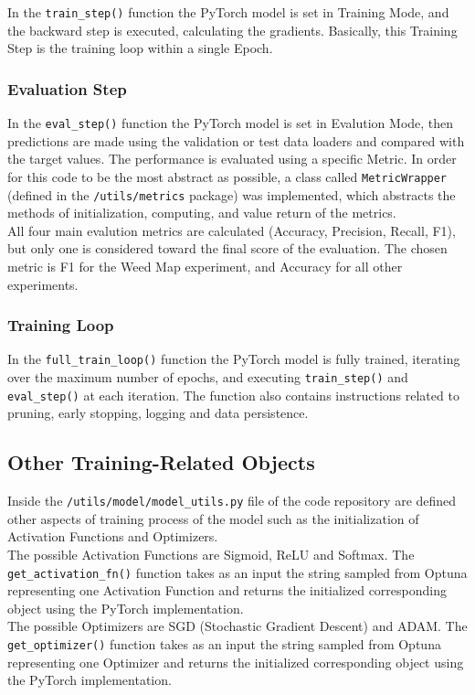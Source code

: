In the \texttt{train\_step()} function the PyTorch model is set in Training Mode, and the backward step is executed, calculating the gradients.
Basically, this Training Step is the training loop within a single Epoch.

\subsubsection{Evaluation Step}

In the \texttt{eval\_step()} function the PyTorch model is set in Evalution Mode, then predictions are made using the validation or test data loaders and compared with the target values.
The performance is evaluated using a specific Metric. In order for this code to be the most abstract as possible, a class called \texttt{MetricWrapper} (defined in the \texttt{/utils/metrics} package) was implemented, which abstracts the methods of initialization, computing, and value return of the metrics.
\\[0.3cm]All four main evalution metrics are calculated (Accuracy, Precision, Recall, F1), but only one is considered toward the final score of the evaluation. The chosen metric is F1 for the Weed Map experiment, and Accuracy for all other experiments.

\subsubsection{Training Loop}

In the \texttt{full\_train\_loop()} function the PyTorch model is fully trained, iterating over the maximum number of epochs, and executing \texttt{train\_step()} and \texttt{eval\_step()} at each iteration.
The function also contains instructions related to pruning, early stopping, logging and data persistence.

\subsection{Other Training-Related Objects}

Inside the \texttt{/utils/model/model\_utils.py} file of the code repository \cite{Repository-THESIS} are defined other aspects of training process of the model such as the initialization of Activation Functions and Optimizers.
\\[0.3cm]The possible Activation Functions are Sigmoid, ReLU and Softmax. The \newline\texttt{get\_activation\_fn()} function takes as an input the string sampled from Optuna representing one Activation Function and returns the initialized corresponding object using the PyTorch implementation.
\\[0.3cm]The possible Optimizers are SGD (Stochastic Gradient Descent) and ADAM. The \texttt{get\_optimizer()} function takes as an input the string sampled from Optuna representing one Optimizer and returns the initialized corresponding object using the PyTorch implementation.



